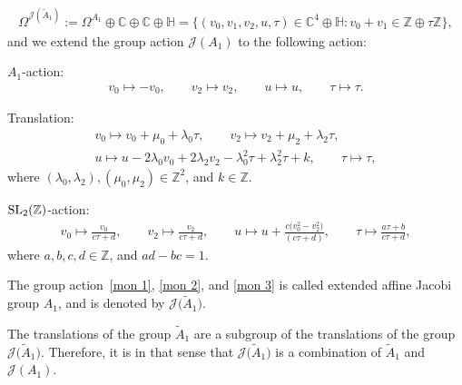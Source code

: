 \documentclass[pdftex]{sigma}%
\numberwithin{equation}{section}
\newcommand{\Ja}{\mathcal{J}}
\begin{document}
\begin{gather*}
\Omega^{\Ja(\tilde A_1)}:=\Omega^{A_1}\oplus\mathbb{C}\oplus\mathbb{C}\oplus\mathbb{H}=\big\{(v_0,v_1,v_2,u,\tau) \in \mathbb{C}^4\oplus\mathbb{H}\colon v_0+v_1\in \mathbb{Z}\oplus\tau\mathbb{Z} \big\},
\end{gather*}
and we extend the group action $\Ja(A_1)$ to the following action:

$A_1$-action:
\begin{gather}\label{mon 1}
v_0\mapsto -v_0,\qquad
v_2\mapsto v_2,\qquad
u\mapsto u,\qquad
\tau\mapsto\tau.
\end{gather}

Translation:
\begin{gather}
v_0\mapsto v_0+\mu_0+\lambda_0\tau,\qquad
v_2\mapsto v_2+\mu_2+\lambda_2\tau,\nonumber
\\
u\mapsto u-2\lambda_0v_0+2\lambda_2v_2-\lambda_0^2\tau+\lambda_2^2\tau+k,\qquad
\tau\mapsto\tau,\label{mon 2}
\end{gather}
where $(\lambda_0,\lambda_2), (\mu_0,\mu_2) \in \mathbb{Z}^2$, and $k \in \mathbb{Z}$.

${\rm SL}_2(\mathbb{Z})$-action:
\begin{gather}\label{mon 3}
v_0\mapsto \frac{v_0}{c\tau+d},\qquad
v_2\mapsto \frac{v_2}{c\tau+d},\qquad
u\mapsto u+\frac{c\big(v_0^2-v_2^2\big)}{(c\tau+d)},\qquad
\tau\mapsto\frac{a\tau+b}{c\tau+d},
\end{gather}
where $a,b,c,d\in \mathbb{Z}$, and $ad-bc=1$.

The group action~\eqref{mon 1}, \eqref{mon 2}, and \eqref{mon 3} is called extended affine Jacobi group $A_1$, and is denoted by $\Ja\big(\tilde A_1\big)$.

\begin{Remark}\sloppy
 The translations of the group $\tilde A_1$ are a subgroup of the translations of the group~$\Ja\big(\tilde A_1\big)$. Therefore, it is in that sense that $\Ja\big(\tilde A_1\big)$ is a combination of $\tilde A_1$ and $\Ja(A_1)$.
\end{Remark}
\end{document}
